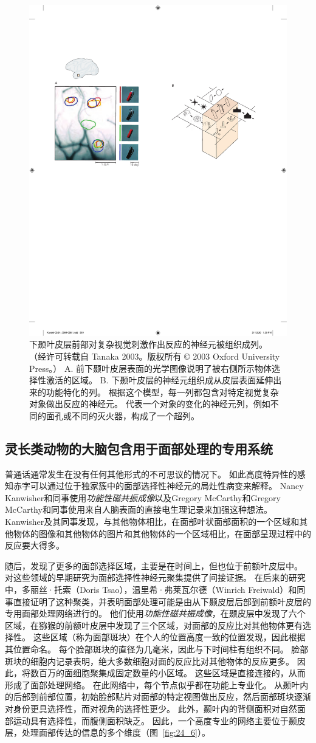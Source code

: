 \begin{figure}[htbp]
	\centering
	\includegraphics[width=0.5\linewidth]{chap24/fig_24_5}
	\caption{下颞叶皮层前部对复杂视觉刺激作出反应的神经元被组织成列。 （经许可转载自 Tanaka 2003。版权所有 © 2003 Oxford University Press。） A. 前下颞叶皮层表面的光学图像说明了被右侧所示物体选择性激活的区域。 B. 下颞叶皮层的神经元组织成从皮层表面延伸出来的功能特化的列。 根据这个模型，每一列都包含对特定视觉复杂对象做出反应的神经元。 代表一个对象的变化的神经元列，例如不同的面孔或不同的灭火器，构成了一个超列。}
	\label{fig:24_5}
\end{figure}



\subsection{灵长类动物的大脑包含用于面部处理的专用系统}

普通话通常发生在没有任何其他形式的不可思议的情况下。
如此高度特异性的感知赤字可以通过位于独家簇中的面部选择性神经元的局灶性病变来解释。
Nancy Kanwisher和同事使用\textit{功能性磁共振成像}以及Gregory McCarthy和Gregory McCarthy和同事使用来自人脑表面的直接电生理记录来加强这种想法。
Kanwisher及其同事发现，与其他物体相比，在面部叶状面部面积的一个区域和其他物体的图像和其他物体的图片和其他物体的一个区域相比，在面部呈现过程中的反应要大得多。


随后，发现了更多的面部选择区域，主要是在时间上，但也位于前额叶皮层中。
对这些领域的早期研究为面部选择性神经元聚集提供了间接证据。
在后来的研究中，多丽丝·托索（Doris Tsao），温里希·弗莱瓦尔德（Winrich Freiwald）和同事直接证明了这种聚类，并表明面部处理可能是由从下颞皮层后部到前额叶皮层的专用面部处理网络进行的。
他们使用\textit{功能性磁共振成像}，在颞皮层中发现了六个区域，在猕猴的前额叶皮层中发现了三个区域，对面部的反应比对其他物体更有选择性。
这些区域（称为面部斑块）在个人的位置高度一致的位置发现，因此根据其位置命名。
每个脸部斑块的直径为几毫米，因此与下时间柱有组织不同。
脸部斑块的细胞内记录表明，绝大多数细胞对面的反应比对其他物体的反应更多。
因此，将数百万的面细胞聚集成固定数量的小区域。
这些区域是直接连接的，从而形成了面部处理网络。
在此网络中，每个节点似乎都在功能上专业化。
从颞叶内的后部到前部位置，初始脸部贴片对面部的特定视图做出反应，然后面部斑块逐渐对身份更具选择性，而对视角的选择性更少。 
此外，颞叶内的背侧面积对自然面部运动具有选择性，而腹侧面积缺乏。
因此，一个高度专业的网络主要位于颞皮层，处理面部传达的信息的多个维度（图~\ref{fig:24_6}）。


